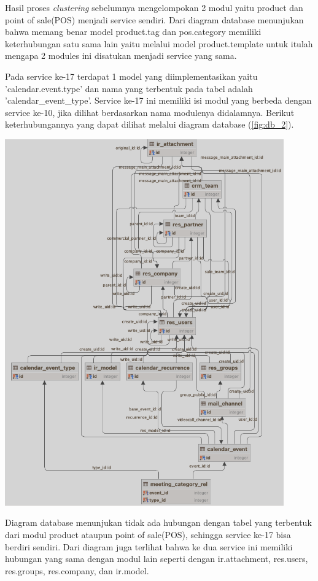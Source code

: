 Hasil proses \textit{clustering} sebelumnya mengelompokan 2 modul yaitu product dan point of sale(POS) menjadi service sendiri. Dari diagram database menunjukan bahwa memang benar model product.tag dan pos.category memiliki keterhubungan satu sama lain yaitu melalui model product.template untuk itulah mengapa 2 modules ini disatukan menjadi service yang sama.  

Pada service ke-17 terdapat 1 model yang diimplementasikan yaitu  'calendar.event.type' dan nama yang terbentuk pada tabel adalah 'calendar\_event\_type'. Service ke-17 ini memiliki isi modul yang berbeda dengan service ke-10, jika dilihat berdasarkan nama modulenya didalamnya. Berikut keterhubungannya yang dapat dilihat melalui diagram database (\ref{fig:db_2}).

\begin{center}
	\includegraphics[width=12cm]{img/bab_4/db_2.png}
	\label{fig:db_2}
\end{center}

Diagram database menunjukan tidak ada hubungan dengan tabel yang terbentuk dari modul product ataupun point of sale(POS), sehingga service ke-17 bisa berdiri sendiri. Dari diagram juga terlihat bahwa ke dua service ini memiliki hubungan yang sama dengan modul lain seperti dengan ir.attachment, res.users, res.groups, res.company, dan ir.model. 